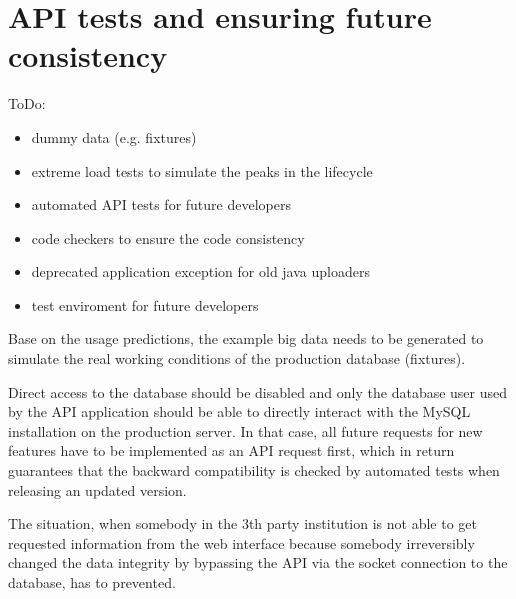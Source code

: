 \chapter{API tests and ensuring future consistency}
\label{chap:apiTests}
ToDo:
\begin{itemize}
	\item dummy data (e.g. fixtures)
	\item extreme load tests to simulate the peaks in the lifecycle
	\item automated API tests for future developers
	\item code checkers to ensure the code consistency
	\item deprecated application exception for old java uploaders
	\item test enviroment for future developers
\end{itemize}


\par Base on the usage predictions, the example big data needs to be generated to simulate the real working conditions of the production database (fixtures).

\par Direct access to the database should be disabled and only the database user used by the API application should be able to directly interact with the MySQL installation on the production server. In that case, all future requests for new features have to be implemented as an API request first, which in return guarantees that the backward compatibility is checked by automated tests when releasing an updated version.

\par The situation, when somebody in the 3th party institution is not able to get requested information from the web interface because somebody irreversibly changed the data integrity by bypassing the API via the socket connection to the database, has to prevented.


